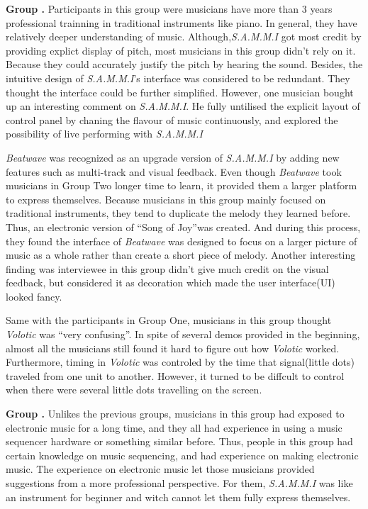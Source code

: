 \textbf{Group .} Participants in this group were musicians have more than 3 years professional trainning in traditional instruments like piano. In general, they have relatively deeper understanding of music. Although,\textit{S.A.M.M.I} got most credit by providing explict display of pitch, most musicians in this group didn't rely on it. Because they could accurately justify the pitch by hearing the sound. Besides, the intuitive design of \textit{S.A.M.M.I}'s interface was considered to be redundant. They thought the interface could be further simplified. However, one musician bought up an interesting comment on \textit{S.A.M.M.I}. He fully untilised the explicit layout of control panel by chaning the flavour of music continuously, and explored the possibility of live performing with \textit{S.A.M.M.I}

\textit{Beatwave} was recognized as an upgrade version of \textit{S.A.M.M.I} by adding new features such as multi-track and visual feedback. Even though \textit{Beatwave} took musicians in Group Two longer time to learn, it provided them a larger platform to express themselves. Because musicians in this group mainly focused on traditional instruments, they tend to duplicate the melody they learned before. Thus, an electronic version of \textquotedblleft{Song of Joy}\textquotedblright was created. And during this process, they found the interface of \textit{Beatwave} was designed to focus on a larger picture of music as a whole rather than create a short piece of melody. Another interesting finding was interviewee in this group didn't give much credit on the visual feedback, but considered it as decoration which made the user interface(UI) looked fancy.

Same with the participants in Group One, musicians in this group thought \textit{Volotic} was \textquotedblleft{very confusing}\textquotedblright. In spite of several demos provided in the beginning, almost all the musicians still found it hard to figure out how \textit{Volotic} worked. Furthermore, timing in \textit{Volotic} was controled by the time that signal(little dots) traveled from one unit to another. However, it turned to be diffcult to control when there were several little dots travelling on the screen.

\textbf{Group .} Unlikes the previous groups, musicians in this group had exposed to electronic music for a long time, and they all had experience in using a music sequencer hardware or something similar before. Thus, people in this group had certain knowledge on music sequencing, and had experience on making electronic music. The experience on electronic music let those musicians provided suggestions from a more professional perspective. For them, \textit{S.A.M.M.I} was like an instrument for beginner and witch cannot let them fully express themselves.


